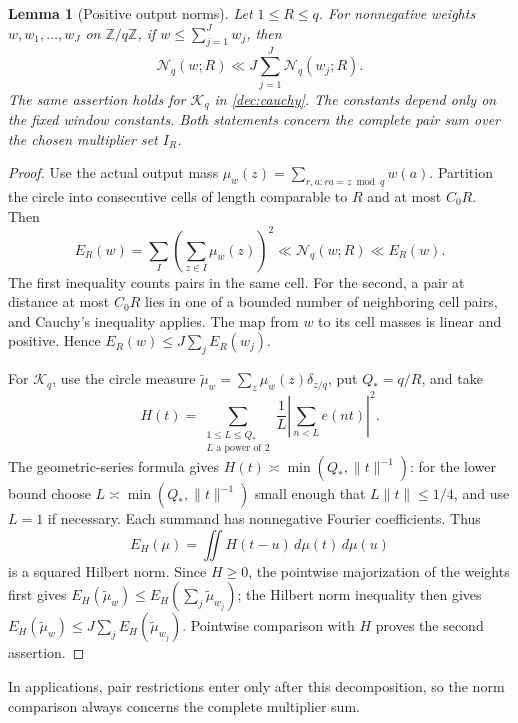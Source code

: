 \documentclass[11pt,a4paper]{article}
\theoremstyle{paperplain}
\newtheorem{lemma}[theorem]{Lemma}
\numberwithin{equation}{section}
\begin{document}
\begin{lemma}[Positive output norms]\label{dec:outputnorm}
Let $1\le R\le q$. For nonnegative weights
$w,w_1,\ldots,w_J$ on $\mathbb Z/q\mathbb Z$,
if $w\le\sum_{j=1}^Jw_j$, then
\[
 \mathcal N_q(w;R)\ll J\sum_{j=1}^J\mathcal N_q(w_j;R).
\]
The same assertion holds for $\mathcal K_q$ in \eqref{dec:cauchy}.
The constants depend only on the fixed window constants.
Both statements concern the complete pair sum over the chosen
multiplier set $I_R$.
\end{lemma}
\begin{proof}
Use the actual output mass
$\mu_w(z)=\sum_{r,a:ra=z\bmod q}w(a)$.
Partition the circle into consecutive cells of length comparable to $R$
and at most $C_0R$. Then
\[
 E_R(w)=\sum_I\left(\sum_{z\in I}\mu_w(z)\right)^2
 \ll\mathcal N_q(w;R)\ll E_R(w).
\]
The first inequality counts pairs in the same cell. For the second,
a pair at distance at most $C_0R$ lies in one of a bounded number of
neighboring cell pairs, and Cauchy's inequality applies.
The map from $w$ to its cell masses is linear and positive. Hence
$E_R(w)\le J\sum_jE_R(w_j)$.

For $\mathcal K_q$, use the circle measure
$\widetilde\mu_w=\sum_z\mu_w(z)\delta_{z/q}$, put $Q_*=q/R$, and take
\[
 H(t)=\sum_{\substack{1\le L\le Q_*\\L\text{ a power of }2}}
 \frac1L\left|\sum_{n<L}e(nt)\right|^2.
\]
The geometric-series formula gives
$H(t)\asymp\min(Q_*,\|t\|^{-1})$: for the lower bound choose
$L\asymp\min(Q_*,\|t\|^{-1})$ small enough that $L\|t\|\le1/4$,
and use $L=1$ if necessary. Each summand has nonnegative Fourier
coefficients. Thus
\[
 E_H(\mu)=\iint H(t-u)\,d\mu(t)\,d\mu(u)
\]
is a squared Hilbert norm. Since $H\ge0$, the pointwise majorization
of the weights first gives
$E_H(\widetilde\mu_w)\le E_H(\sum_j\widetilde\mu_{w_j})$;
the Hilbert norm inequality then gives
$E_H(\widetilde\mu_w)\le J\sum_jE_H(\widetilde\mu_{w_j})$.
Pointwise comparison with $H$ proves the second assertion.
\end{proof}

In applications, pair restrictions enter only after this decomposition,
so the norm comparison always concerns the complete multiplier sum.
\end{document}
